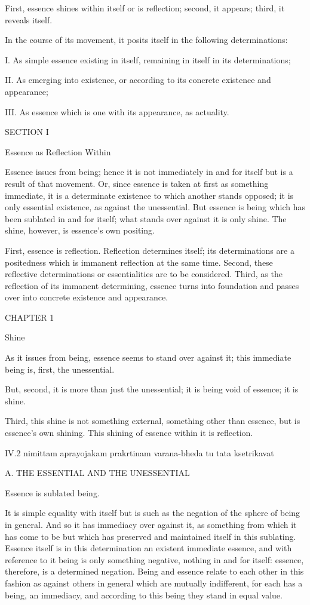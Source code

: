 First, essence shines within itself
or is reflection;
second, it appears;
third, it reveals itself.

In the course of its movement,
it posits itself in the following determinations:

I. As simple essence existing in itself,
remaining in itself in its determinations;

II. As emerging into existence,
or according to its concrete existence and appearance;

III. As essence which is one with its appearance,
as actuality.

SECTION I

Essence as Reflection Within

Essence issues from being;
hence it is not immediately in and for itself
but is a result of that movement.
Or, since essence is taken at first as something immediate,
it is a determinate existence to which another stands opposed;
it is only essential existence, as against the unessential.
But essence is being which has been sublated in and for itself;
what stands over against it is only shine.
The shine, however, is essence's own positing.

First, essence is reflection.
Reflection determines itself;
its determinations are a positedness
which is immanent reflection at the same time.
Second, these reflective determinations
or essentialities are to be considered.
Third, as the reflection of its immanent determining,
essence turns into foundation and passes over
into concrete existence and appearance.

CHAPTER 1

Shine

As it issues from being, essence seems to stand over against it;
this immediate being is, first, the unessential.

But, second, it is more than just the unessential;
it is being void of essence; it is shine.

Third, this shine is not something external,
something other than essence, but is essence's own shining.
This shining of essence within it is reflection.

IV.2
nimittam aprayojakam prakrtinam varana-bheda tu tata ksetrikavat

A. THE ESSENTIAL AND THE UNESSENTIAL

Essence is sublated being.

It is simple equality with itself
but is such as the negation of
the sphere of being in general.
And so it has immediacy over against it,
as something from which it has come to be but which has
preserved and maintained itself in this sublating.
Essence itself is in this determination
an existent immediate essence,
and with reference to it
being is only something negative,
nothing in and for itself:
essence, therefore, is a determined negation.
Being and essence relate to each other in this fashion
as against others in general which are mutually indifferent,
for each has a being, an immediacy,
and according to this being they stand in equal value.

